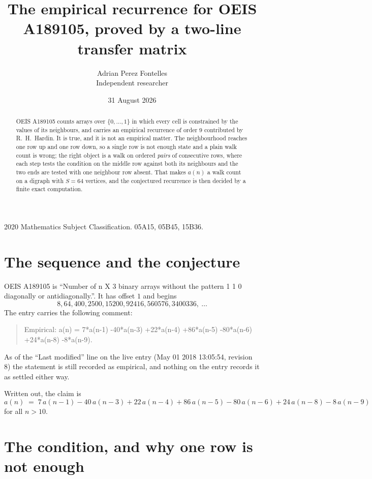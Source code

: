 \documentclass[11pt,a4paper]{article}
\title{The empirical recurrence for OEIS A189105, proved by a two-line transfer matrix}
\author{Adrian Perez Fontelles\\ \small Independent researcher}
\date{31 August 2026}
\theoremstyle{plain}
\theoremstyle{definition}
\begin{document}
\maketitle

\begin{abstract}
OEIS A189105 counts arrays over $\{0,\dots,1\}$ in which every cell is constrained by the
values of its neighbours, and carries an empirical recurrence of order $9$ contributed
by R.~H.~Hardin. It is true, and it is not an empirical matter. The neighbourhood reaches one
row up and one row down, so a single row is not enough state and a plain walk count
is wrong; the right object is a walk on ordered \emph{pairs} of consecutive rows, where
each step tests the condition on the middle row against both its neighbours and the two
ends are tested with one neighbour row absent. That makes $a(n)$ a walk count on a digraph
with $S=64$ vertices, and the conjectured recurrence is then decided by a finite exact
computation.
\end{abstract}

\noindent\small 2020 Mathematics Subject Classification. 05A15, 05B45, 15B36.\normalsize

\section{The sequence and the conjecture}

OEIS A189105 is ``Number of n X 3 binary arrays without the pattern 1 1 0 diagonally or antidiagonally.''. It has offset $1$ and begins
\[
8, 64, 400, 2500, 15200, 92416, 560576, 3400336,\ \dots
\]
The entry carries the following comment:
\begin{quote}\small
Empirical: a(n) = 7*a(n-1) -40*a(n-3) +22*a(n-4) +86*a(n-5) -80*a(n-6) +24*a(n-8) -8*a(n-9).
\end{quote}
As of the ``Last modified'' line on the live entry (May 01 2018 13:05:54, revision 8) the statement is
still recorded as empirical, and nothing on the entry records it as settled either way.

Written out, the claim is
\begin{equation}\label{eq:conj}
a(n)\;=\;7\,a(n-1) - 40\,a(n-3) + 22\,a(n-4) + 86\,a(n-5) - 80\,a(n-6) + 24\,a(n-8) - 8\,a(n-9)
\end{equation}
for all $n>10$.

\section{The condition, and why one row is not enough}
\end{document}
